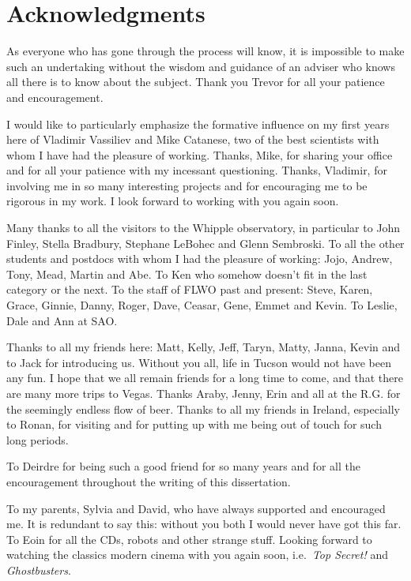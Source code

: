 \chapter*{Acknowledgments}
\begin{singlespace}

As everyone who has gone through the process will know, it is
impossible to make such an undertaking without the wisdom and guidance
of an adviser who knows all there is to know about the subject. Thank
you Trevor for all your patience and encouragement.

I would like to particularly emphasize the formative influence on my
first years here of Vladimir Vassiliev and Mike Catanese, two of the
best scientists with whom I have had the pleasure of working. Thanks,
Mike, for sharing your office and for all your patience with my
incessant questioning. Thanks, Vladimir, for involving me in so many
interesting projects and for encouraging me to be rigorous in my
work. I look forward to working with you again soon.

Many thanks to all the visitors to the Whipple observatory, in
particular to John Finley, Stella Bradbury, Stephane LeBohec and Glenn
Sembroski. To all the other students and postdocs with whom I had the
pleasure of working: Jojo, Andrew, Tony, Mead, Martin and Abe. To Ken
who somehow doesn't fit in the last category or the next. To the
staff of FLWO past and present: Steve, Karen, Grace, Ginnie, Danny,
Roger, Dave, Ceasar, Gene, Emmet and Kevin. To Leslie, Dale and Ann at
SAO.

Thanks to all my friends here: Matt, Kelly, Jeff, Taryn, Matty, Janna,
Kevin and to Jack for introducing us. Without you all, life in Tucson
would not have been any fun. I hope that we all remain friends for a
long time to come, and that there are many more trips to Vegas. Thanks
Araby, Jenny, Erin and all at the R.G. for the seemingly endless flow
of beer. Thanks to all my friends in Ireland, especially to Ronan, for
visiting and for putting up with me being out of touch for such long
periods.

To Deirdre for being such a good friend for so many years and for
all the encouragement throughout the writing of this dissertation.

To my parents, Sylvia and David, who have always supported and
encouraged me. It is redundant to say this: without you
both I would never have got this far. To Eoin for all the CDs, robots
and other strange stuff. Looking forward to watching the classics
modern cinema with you again soon, i.e.\ \textit{Top Secret!} and
\textit{Ghostbusters}.


\end{singlespace}
